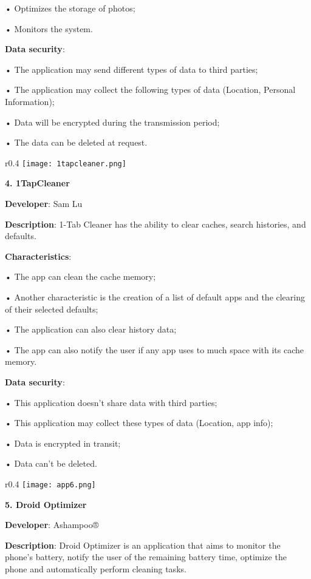 • Optimizes the storage of photos;

• Monitors the system.

\textbf{Data security}:

• The application may send different types of data to third parties;

• The application may collect the following types of data (Location, Personal Information);

• Data will be encrypted during the transmission period;

• The data can be deleted at request.\newline

\newpage
\begin{wrapfigure}{r}{0.4\textwidth} 
    \centering
    \texttt{[image: 1tapcleaner.png]}
\end{wrapfigure}

\noindent 
\textbf{4. 1TapCleaner }

\textbf{Developer}: Sam Lu

\textbf{Description}: 1-Tab Cleaner has the ability to clear caches, search histories, and defaults.

\textbf{Characteristics}:

• The app can clean the cache memory;

• Another characteristic is the creation of a list of default apps and the clearing of their selected defaults;

• The application can also clear history data;

• The app can also notify the user if any app uses to much space with its cache memory.

\textbf{Data security}:

• This application doesn't share data with third parties;

• This application may collect these types of data (Location, app info);

• Data is encrypted in transit;

• Data can't be deleted.\newline

\begin{wrapfigure}{r}{0.4\textwidth} 
    \centering
    \texttt{[image: app6.png]}
\end{wrapfigure}

\noindent 
\textbf{5. Droid Optimizer }

\textbf{Developer}: Ashampoo®

\textbf{Description}: Droid Optimizer is an application that aims to monitor the phone's battery, notify the user of the remaining battery time, optimize the phone and automatically perform cleaning tasks.

